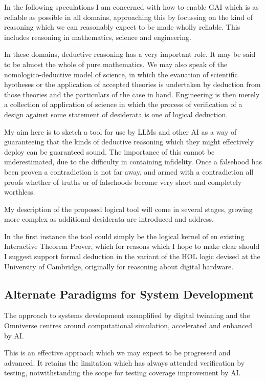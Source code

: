 \documentclass[10pt,titlepage]{book}
\begin{document}
In the following speculations I am concerned with how to enable GAI which is as reliable as possible in all domains, approaching this by focussing on the kind of reasoning which we can reasonably expect to be made wholly reliable.
This includes reasoning in mathematics, science and engineering.

In these domains, deductive reasoning has a very important role.
It may be said to be almost the whole of pure mathematics.
We may also speak of the nomologico-deductive model of science, in which the evauation of scientific hyotheses or the application of accepted theories is undertaken by deduction from those theories and the particulars of the case in hand.
Engineering is then merely a collection of application of science in which the process of verification of a design against some statement of desiderata is one of logical deduction.


My aim here is to sketch a tool for use by LLMs and other AI as a way of guaranteeing that the kinds of deductive reasoning which they might effectively deploy can be guaranteed sound.
The importance of this cannot be underestimated, due to the difficulty in containing infidelity.
Once a falsehood has been proven a contradiction is not far away, and armed with a contradiction all proofs whether of truths or of falsehoods become very short and completely worthless.

My description of the proposed logical tool will come in several stages, growing more complex as additional desiderata are introduced and address.

In the first instance the tool could simply be the logical kernel of en existing Interactive Theorem Prover, which for reasons which I hope to make clear should I suggest support formal deduction in the variant of the HOL logic devised at the University of Cambridge, originally for reasoning about digital hardware.


\subsection{Alternate Paradigms for System Development}

The approach to systems development exemplified by digital twinning and the Omniverse centres around computational simulation, accelerated and enhanced by AI.

This is an effective approach which we may expect to be progressed and advanced.
It retains the limitation which has always attended verification by testing, notwithstanding the scope for testing coverage improvement by AI.
\end{document}
